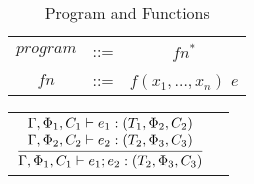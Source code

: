 \documentclass{article}
\newcommand{\infrule}[2]{\displaystyle\frac{\displaystyle\strut{#1}}{\displaystyle\strut {#2}}}
\newcommand{\rtriple}[3]{\left({#1},{#2},{#3}\right)}
\newcommand{\rtripsub}[3]{\rtriple{#1}{\Phi_{#2}}{C_{#3}}}
\newcommand{\envsub}[2]{\Gamma, \Phi_{#1}, C_{#2} \vdash}
\begin{document}
\pagestyle{fancy}

\begin{table*}
\centering
{\small
\begin{tabular}{ccc}
$program$ & ::= & $fn^*$ \\
$fn$ & ::= & $f(x_1, \ldots, x_n)$ $e$ \\
\end{tabular}
}
\caption{Program and Functions}
\end{table*}


\begin{table*}
\centering
{\small
\begin{tabular}{cc}
%
%
\begin{math}
\infrule{
\begin{array}{lc}
  \envsub{1}{1} e_1 : \rtripsub{T_1}{2}{2} \\
  \envsub{2}{2} e_2 : \rtripsub{T_2}{3}{3} 
\end{array}
}
{
  \envsub{1}{1} e_1; e_2 : \rtripsub{T_2}{3}{3}
}
\end{math} 
&\raisebox{-0.2in}{[{\tt Composition}]} \\


\end{tabular}}
\end{table*}
\end{document}
